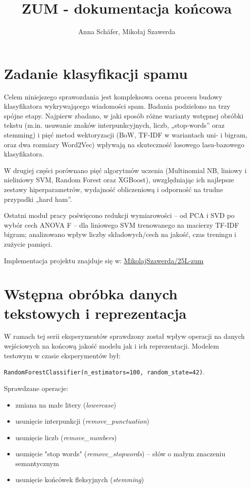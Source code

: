 \documentclass{article}
\title{ZUM - dokumentacja końcowa}
\author{Anna Schäfer, Mikołaj Szawerda}
\begin{document}
\maketitle

\section{Zadanie klasyfikacji spamu}

Celem niniejszego sprawozdania jest kompleksowa ocena procesu budowy klasyfikatora wykrywającego wiadomości spam. Badania podzielono na trzy spójne etapy. Najpierw zbadano, w jaki sposób różne warianty wstępnej obróbki tekstu (m.in. usuwanie znaków interpunkcyjnych, liczb, „stop-words” oraz stemming) i pięć metod wektoryzacji (BoW, TF-IDF w wariantach uni- i bigram, oraz dwa rozmiary Word2Vec) wpływają na skuteczność losowego lasu-bazowego klasyfikatora.

W drugiej części porównano pięć algorytmów uczenia (Multinomial NB, liniowy i nieliniowy SVM, Random Forest oraz XGBoost), uwzględniając ich najlepsze zestawy hiperparametrów, wydajność obliczeniową i odporność na trudne przypadki „hard ham”.

Ostatni moduł pracy poświęcono redukcji wymiarowości – od PCA i SVD po wybór cech ANOVA F – dla liniowego SVM trenowanego na macierzy TF-IDF bigram; analizowano wpływ liczby składowych/cech na jakość, czas treningu i zużycie pamięci. 

Implementacja projektu znajduje się w: \href{https://github.com/MikolajSzawerda/25L-zum}{MikolajSzawerda/25L-zum}

\section{Wstępna obróbka danych tekstowych i reprezentacja}

W ramach tej serii eksperymentów sprawdzony został wpływ operacji na danych wejściowych na końcową jakość modelu jak i ich reprezentacji. Modelem testowym w czasie eksperymentów był:

\texttt{RandomForestClassifier(n\_estimators=100, random\_state=42)}.


Sprawdzane operacje:
\begin{itemize}
    \item zmiana na małe litery (\textit{lowercase})
    \item usunięcie interpunkcji (\textit{remove\_punctuation})
    \item usunięcie liczb (\textit{remove\_numbers})
    \item usunięcie "stop words" (\textit{remove\_stopwords}) -- słów o małym znaczeniu semantycznym
    \item usunięcie końcówek fleksyjnych (\textit{stemming})
\end{itemize}
\end{document}
